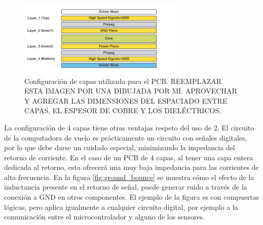 \begin{figure}[H]
    \centering
    \includegraphics[width=0.7\textwidth]{img/stackup.png}
    \caption{Configuración de capas utilizada para el PCB. {\color{red} REEMPLAZAR ESTA IMAGEN POR UNA DIBUJADA POR MI. APROVECHAR Y AGREGAR LAS DIMENSIONES DEL ESPACIADO ENTRE CAPAS, EL ESPESOR DE COBRE Y LOS DIELÉCTRICOS.}}
    \label{fig:stackup}
\end{figure}






La configuración de 4 capas tiene otras ventajas respeto del uso de 2. El circuito de la computadora de vuelo es prácticamente un circuito con señales digitales, por lo que debe darse un cuidado especial, minimizando la impedancia del retorno de corriente. En el caso de un PCB de 4 capas, al tener una capa entera dedicada al retorno, esta ofrecerá una muy baja impedancia para las corrientes de alta frecuencia. En la figura \ref{fig:ground_bounce} se muestra cómo el efecto de la inductancia presente en el retorno de señal, puede generar ruido a través de la conexión a GND en otros componentes. El ejemplo de la figura es con compuertas lógicas, pero aplica igualmente a cualquier circuito digital, por ejemplo a la comunicación entre el microcontrolador y alguno de los sensores.

